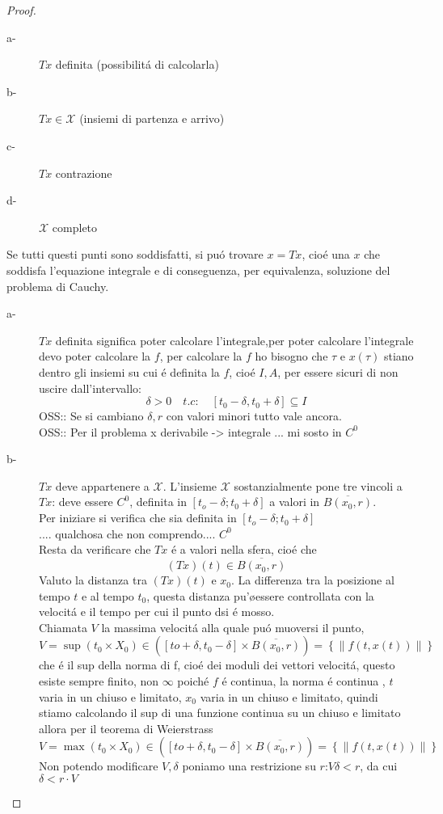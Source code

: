 \begin{proof}
\begin{description}
		\item[a-] $Tx$ definita (possibilit\'a di calcolarla)
		\item[b-] $Tx\in\mathcal{X}$ (insiemi di partenza e arrivo)
		\item[c-] $Tx$ contrazione
		\item[d-] $\mathcal{X}$ completo
	\end{description}
	Se tutti questi punti sono soddisfatti, si pu\'o trovare $x=Tx$, cio\'e una $x$ che soddisfa l'equazione integrale e di conseguenza, per equivalenza, soluzione del problema di Cauchy.  
	\begin{description}
		\item[a-] $Tx$ definita significa poter calcolare l'integrale,per poter calcolare l'integrale devo poter calcolare la $f$, per calcolare la $f$ ho bisogno che $\tau$ e $x(\tau)$ stiano dentro gli insiemi su cui \'e definita la $f$, cio\'e $I,A$, per essere sicuri di non uscire dall'intervallo:
		$$\delta>0\quad t.c:\quad \left[t_0-\delta,t_0+\delta\right]\subseteq I$$
		OSS:: Se si cambiano $\delta, r$ con valori minori tutto vale ancora.\\
		OSS:: Per il problema x derivabile -> integrale  ... mi sosto in $C^0$
		\item[b-] $Tx$ deve appartenere a $\mathcal{X}$. L'insieme $\mathcal{X}$ sostanzialmente pone tre vincoli a $Tx$: deve essere $C^0$, definita in $\left[t_o-\delta;t_0+\delta\right]$ a valori in $\overline{B(x_0,r)}$.\\
		Per iniziare si verifica che sia definita in $\left[t_o-\delta;t_0+\delta\right]$\\
		.... qualchosa che non comprendo.... $C^0$\\
		Resta da verificare che $Tx$ \'e a valori nella sfera, cio\'e che 
		$$(Tx)(t) \in \overline{B(x_0,r)}$$
		Valuto la distanza tra $(Tx)(t)$ e $x_0$. La differenza tra la posizione al tempo $t$ e al tempo $t_0$, questa distanza pu'\o essere controllata con la velocit\'a e il tempo per cui il punto dsi \'e mosso.\\
		Chiamata $V$ la massima velocit\'a alla quale pu\'o muoversi il punto, $V=\sup\limits{(t_0\times X_0)\in (\left[to+\delta,t_0-\delta\right]\times\overline{B(x_0,r)})}=\left\{\left\|f(t,x(t))\right\|\right\}$ che \'e il sup della norma di f, cio\'e dei moduli dei vettori velocit\'a, questo esiste sempre finito, non $\infty$ poich\'e $f$ \'e continua, la norma \'e continua , $t$ varia in un chiuso e limitato, $x_0$ varia in un chiuso e limitato, quindi stiamo calcolando  il sup di una funzione continua su un chiuso e limitato allora per il teorema di Weierstrass $V=\max\limits{(t_0\times X_0)\in (\left[to+\delta,t_0-\delta\right]\times\overline{B(x_0,r)})}=\left\{\left\|f(t,x(t))\right\|\right\}$\\
		Non potendo modificare $V, \delta$ poniamo una restrizione su $r$:$V\delta < r$, da cui $\delta < r\cdot V$
		

\end{description}
\end{proof}

